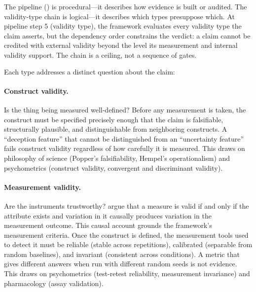 \documentclass{article}
\begin{document}
The pipeline () is procedural---it describes how evidence is built or audited. The validity-type chain is logical---it describes which types presuppose which. At pipeline step 5 (validity type), the framework evaluates every validity type the claim asserts, but the dependency order constrains the verdict: a claim cannot be credited with external validity beyond the level its measurement and internal validity support. The chain is a ceiling, not a sequence of gates.

Each type addresses a distinct question about the claim:

\paragraph{Construct validity.} Is the thing being measured well-defined? Before any measurement is taken, the construct must be specified precisely enough that the claim is falsifiable, structurally plausible, and distinguishable from neighboring constructs. A ``deception feature'' that cannot be distinguished from an ``uncertainty feature'' fails construct validity regardless of how carefully it is measured. This draws on philosophy of science (Popper's falsifiability, Hempel's operationalism) and psychometrics (construct validity, convergent and discriminant validity).

\paragraph{Measurement validity.} Are the instruments trustworthy? \citet{borsboom2004concept} argue that a measure is valid if and only if the attribute exists and variation in it causally produces variation in the measurement outcome. This causal account grounds the framework's measurement criteria. Once the construct is defined, the measurement tools used to detect it must be reliable (stable across repetitions), calibrated (separable from random baselines), and invariant (consistent across conditions). A metric that gives different answers when run with different random seeds is not evidence. This draws on psychometrics (test-retest reliability, measurement invariance) and pharmacology (assay validation).
\end{document}
